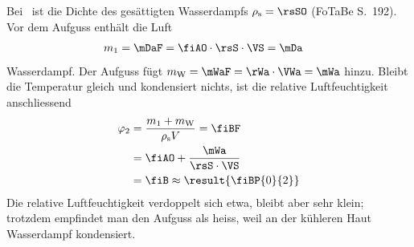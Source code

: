 Bei \thSO\ ist die Dichte des gesättigten Wasserdampfs $\rho_\text{s} = \rsSO$ (FoTaBe S.~192). Vor dem Aufguss enthält die Luft
\begin{align}
 m_1 &= \mDaF = \fiAO\cdot\rsS\cdot\VS = \mDa
\end{align}
Wasserdampf. Der Aufguss fügt $m_\text{W} = \mWaF = \rWa\cdot\VWa = \mWa$ hinzu. Bleibt die Temperatur gleich und kondensiert nichts, ist die relative Luftfeuchtigkeit anschliessend
\begin{align}
 \varphi_2 &= \frac{m_1+m_\text{W}}{\rho_\text{s}V} = \fiBF \\
   &= \fiAO + \frac{\mWa}{\rsS\cdot\VS} \\
   &= \fiB \approx \result{\fiBP{0}{2}}
\end{align}
Die relative Luftfeuchtigkeit verdoppelt sich etwa, bleibt aber sehr klein; trotzdem empfindet man den Aufguss als heiss, weil an der kühleren Haut Wasserdampf kondensiert.
